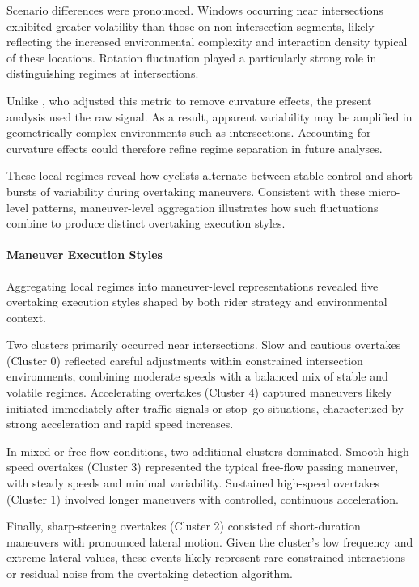 Scenario differences were pronounced. Windows occurring near intersections exhibited greater volatility than those on non-intersection segments, likely reflecting the increased environmental complexity and interaction density typical of these locations. Rotation fluctuation played a particularly strong role in distinguishing regimes at intersections.

Unlike \citeauthor{bachir_identifying_2025}, who adjusted this metric to remove curvature effects, the present analysis used the raw signal. As a result, apparent variability may be amplified in geometrically complex environments such as intersections. Accounting for curvature effects could therefore refine regime separation in future analyses.

These local regimes reveal how cyclists alternate between stable control and short bursts of variability during overtaking maneuvers. Consistent with these micro-level patterns, maneuver-level aggregation illustrates how such fluctuations combine to produce distinct overtaking execution styles.

\paragraph{Maneuver Execution Styles}
Aggregating local regimes into maneuver-level representations revealed five overtaking execution styles shaped by both rider strategy and environmental context.

Two clusters primarily occurred near intersections. Slow and cautious overtakes (Cluster 0) reflected careful adjustments within constrained intersection environments, combining moderate speeds with a balanced mix of stable and volatile regimes. Accelerating overtakes (Cluster 4) captured maneuvers likely initiated immediately after traffic signals or stop–go situations, characterized by strong acceleration and rapid speed increases.

In mixed or free-flow conditions, two additional clusters dominated. Smooth high-speed overtakes (Cluster 3) represented the typical free-flow passing maneuver, with steady speeds and minimal variability. Sustained high-speed overtakes (Cluster 1) involved longer maneuvers with controlled, continuous acceleration.

Finally, sharp-steering overtakes (Cluster 2) consisted of short-duration maneuvers with pronounced lateral motion. Given the cluster’s low frequency and extreme lateral values, these events likely represent rare constrained interactions or residual noise from the overtaking detection algorithm.

